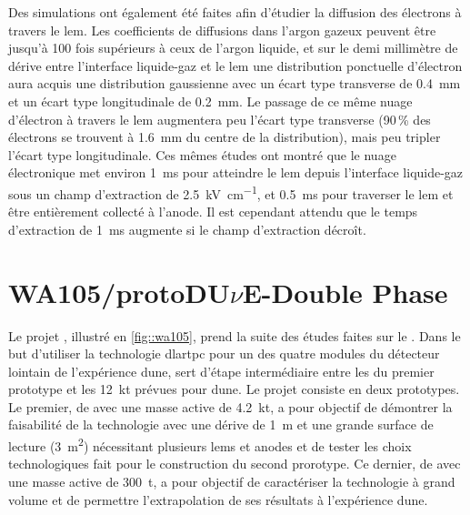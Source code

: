       Des simulations ont également été faites afin d'étudier la diffusion des électrons à travers le \gls{lem}\cite{Wu2017}. Les coefficients de diffusions dans l'argon gazeux peuvent être jusqu'à 100 fois supérieurs à ceux de l'argon liquide, et sur le demi millimètre de dérive entre l'interface liquide-gaz et le \gls{lem} une distribution ponctuelle d'électron aura acquis une distribution gaussienne avec un écart type transverse de \SI{0.4}{\milli\meter} et un écart type longitudinale de \SI{0.2}{\milli\meter}. Le passage de ce même nuage d'électron à travers le \gls{lem} augmentera peu l'écart type transverse (90\,\% des électrons se trouvent à \SI{1.6}{\milli\meter} du centre de la distribution), mais peu tripler l'écart type longitudinale. Ces mêmes études ont montré que le nuage électronique met environ \SI{1}{\milli\second} pour atteindre le \gls{lem} depuis l'interface liquide-gaz sous un champ d'extraction de \SI{2.5}{\kilo\volt\per\centi\meter}, et \SI{0.5}{\milli\second} pour traverser le \gls{lem} et être entièrement collecté à l'anode. Il est cependant attendu que le temps d'extraction de \SI{1}{\milli\second} augmente si le champ d'extraction décroît.
    
  \section{WA105/\texorpdfstring{protoDU$\nu$E}{protoDUNE}-Double Phase}
    
    Le projet \protodp{}, illustré en \autoref{fig::wa105}, prend la suite des études faites sur le \threeL{}. Dans le but d'utiliser la technologie \gls{dlartpc} pour un des quatre modules du détecteur lointain de l'expérience \gls{dune}, \protodp{} sert d'étape intermédiaire entre les \threeL{} du premier prototype et les  \SI{12}{\kilo\tonne} prévues pour \gls{dune}. Le projet consiste en deux prototypes. Le premier, de \TOO{} avec une masse active de \SI{4.2}{\kilo\tonne}, a pour objectif de démontrer la faisabilité de la technologie avec une dérive de \SI{1}{\meter} et une grande surface de lecture (\SI{3}{\meter\squared}) nécessitant plusieurs \glspl{lem} et anodes et de tester les choix technologiques fait pour le construction du second prorotype. Ce dernier, de \SSS{} avec une masse active de \SI{300}{\tonne}, a pour objectif de caractériser la technologie à grand volume et de permettre l'extrapolation de ses résultats à l'expérience \gls{dune}.

